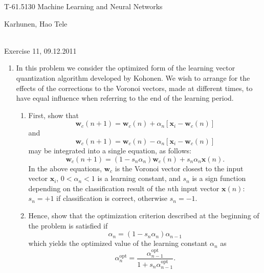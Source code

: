 \documentclass[10pt]{article}
\begin{document}
\pagestyle{empty}
\begin{Large}
\begin{bf} 
T-61.5130 Machine Learning and Neural Networks\\ 
\end{bf}
\end{Large}
Karhunen, Hao Tele\\  
\\
\begin{large}
\begin{bf}
Exercise 11, 09.12.2011
\end{bf}
\end{large}
\begin{enumerate}

\item In this problem we consider the optimized form of the learning
vector quantization algorithm developed by
Kohonen. We wish to arrange for the effects of the corrections to the
Voronoi vectors, made at different times, to have equal influence when
referring to the end of the learning period. \begin{enumerate}
   \item First, show that
   \begin{equation*}
   \mathbf{w}_c(n+1)=\mathbf{w}_c(n)+\alpha_n[\mathbf{x}_i-\mathbf{w}_c(n)]
   \end{equation*}
   and
   \begin{equation*}
   \mathbf{w}_c(n+1)=\mathbf{w}_c(n)-\alpha_n[\mathbf{x}_i-\mathbf{w}_c(n)]
   \end{equation*}
   may be integrated into a single equation, as follows:
   \begin{equation*}
   \mathbf{w}_c(n+1)=(1-s_n\alpha_n)\mathbf{w}_c(n)+s_n\alpha_n\mathbf{x}(n).
   \end{equation*}
   In the above equations, $\mathbf{w}_c$ is the Voronoi
   vector closest to the input vector $\mathbf{x}_i$, $0<\alpha_n<1$ is a
   learning constant, and $s_n$ is a sign function depending on the
   classification result of the $n$th input vector $\mathbf{x}(n)$:
   $s_n=+1$ if classification is correct, otherwise  $s_n=-1$.

   \item Hence, show that the optimization criterion described at the
   beginning of the problem is satisfied if
   \begin{equation*}
   \alpha_n=(1-s_n\alpha_n)\alpha_{n-1}
   \end{equation*}
   which yields the optimized value of the learning constant
   $\alpha_n$ as
   \begin{equation*}
   \alpha_n^{\text{opt}}=\frac{\alpha_{n-1}^{\text{opt}}}{1+s_n\alpha_{n-1}^{\text{opt}}}.
   \end{equation*}
\end{enumerate}


\end{enumerate}
\end{document}
